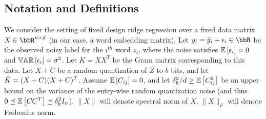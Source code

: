 	


%


\subsection{Notation and Definitions}
We consider the setting of fixed design ridge regression over a fixed data matrix $X \in \RR^{n\times d}$ (in our case, a word embedding matrix). Let $y_i = \by_i + \eps_i \in \RR$ be the observed noisy label for the $i^{th}$ word $z_i$, where the noise satisfies $\expect{}{\eps_i} = 0$ and $\var{}{\eps_i} = \sigma^2$.  Let $K = XX^T$ be the Gram matrix corresponding to this data.  Let $X+C$ be a random quantization of $Z$ to $b$ bits, and let $\tK = (X+C)(X+C)^T$. Assume $\expect{}{C_{ij}} = 0$, and let $\delta_b^2/d \geq \expect{}{C_{ij}^2}$ be an upper bound on the variance of the entry-wise random quantization noise (and thus $0 \preceq \expect{}{CC^T} \preceq \delta_b^2 I_n$).  $\|X\|$ will denote spectral norm of $X$, $\|X\|_F$ will denote Frobenius norm.


